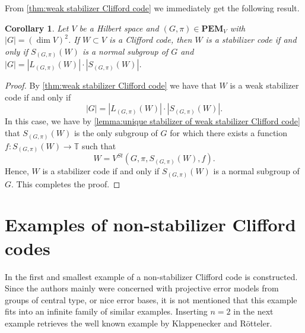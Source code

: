 \documentclass[11pt, oneside, reqno]{amsart}
\newcommand{\bbT}{\mathbb{T}}
\newcommand{\PEM}{\mathbf{PEM}}
\theoremstyle{definition}
\theoremstyle{plain}
\newtheorem{corollary}[definition]{Corollary}
\theoremstyle{remark}
\begin{document}
From \cref{thm:weak stabilizer Clifford code} we immediately get the following result.

\begin{corollary}\label{cor:stabilizer Clifford code}
    Let $V$ be a Hilbert space and $(G,\pi) \in \PEM_V$ with $|G| = (\dim V)^2$. If $W \subset V$ is a Clifford code, then $W$ is a stabilizer code if and only if $S_{(G,\pi)}(W)$ is a normal subgroup of $G$ and $|G| = |L_{(G,\pi)}(W)|\cdot|S_{(G,\pi)}(W)|$.
\end{corollary}
\begin{proof}
    By \cref{thm:weak stabilizer Clifford code} we have that $W$ is a weak stabilizer code if and only if
    \begin{equation*}
        |G| = |L_{(G,\pi)}(W)|\cdot|S_{(G,\pi)}(W)|.
    \end{equation*}
    In this case, we have by \cref{lemma:unique stabilizer of weak stabilizer Clifford code} that $S_{(G,\pi)}(W)$ is the only subgroup of $G$ for which there exists a function $f \colon S_{(G,\pi)}(W) \to \bbT$ such that
    \begin{equation*}
        W = V^{St}(G,\pi,S_{(G,\pi)}(W),f).
    \end{equation*}
    Hence, $W$ is a stabilizer code if and only if $S_{(G,\pi)}(W)$ is a normal subgroup of $G$. This completes the proof.
\end{proof}

\section{Examples of non-stabilizer Clifford codes}\label{sec:non-stabilizer Clifford codes}

In \cite[Section 10.9]{KlappeneckerRötteler02} the first and smallest example of a non-stabilizer Clifford code is constructed. Since the authors mainly were concerned with projective error models from groups of central type, or nice error bases, it is not mentioned that this example fits into an infinite family of similar examples. Inserting $n = 2$ in the next example retrieves the well known example by Klappenecker and R{\"o}tteler.
\end{document}
